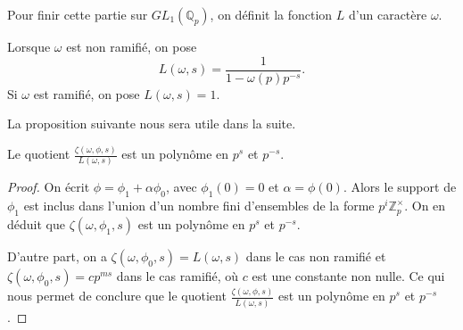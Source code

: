 Pour finir cette partie sur $GL_1(\mathbb{Q}_p)$, on définit la fonction $L$ d'un caractère $\omega$.
\begin{definition}
Lorsque $\omega$ est non ramifié, on pose
\begin{equation}
L(\omega,s) = \frac{1}{1-\omega(p)p^{-s}}.
\end{equation}
Si $\omega$ est ramifié, on pose $L(\omega,s)=1$.
\end{definition}

La proposition suivante nous sera utile dans la suite.
\begin{proposition}
Le quotient $\frac{\zeta(\omega, \phi, s)}{L(\omega,s)}$ est un polynôme en $p^s$ et $p^{-s}$.
\end{proposition}

\begin{proof}
On écrit $\phi = \phi_1 + \alpha \phi_0$, avec $\phi_1(0)=0$ et $\alpha = \phi(0)$. Alors le support de $\phi_1$ est inclus dans l'union d'un nombre fini d'ensembles de la forme $p^i \mathbb{Z}_p^\times$. On en déduit que $\zeta(\omega, \phi_1, s)$ est un polynôme en $p^s$ et $p^{-s}$. 

D'autre part, on a $\zeta(\omega, \phi_0, s) = L(\omega, s)$ dans le cas non ramifié et $\zeta(\omega, \phi_0, s) = cp^{ms}$ dans le cas ramifié, où $c$ est une constante non nulle. Ce qui nous permet de conclure que le quotient $\frac{\zeta(\omega, \phi, s)}{L(\omega,s)}$ est un polynôme en $p^s$ et $p^{-s}$.
\end{proof}